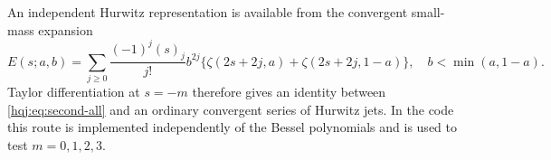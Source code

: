 An independent Hurwitz representation is available from the convergent
small-mass expansion
\begin{equation}\label{hqj:eq:Ebinomial}
E(s;a,b)=\sum_{j\ge0}\frac{(-1)^j(s)_j}{j!}b^{2j}
\bigl\{\zeta(2s+2j,a)+\zeta(2s+2j,1-a)\bigr\},
\quad b<\min(a,1-a).
\end{equation}
Taylor differentiation at $s=-m$ therefore gives an identity between
\eqref{hqj:eq:second-all} and an ordinary convergent series of Hurwitz
jets. In the code this route is implemented independently of the Bessel
polynomials and is used to test $m=0,1,2,3$.
